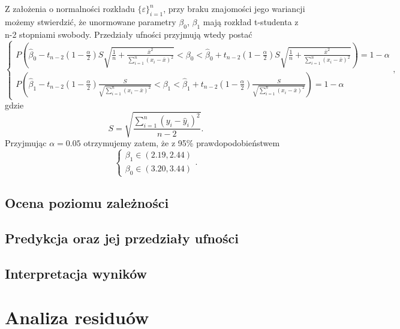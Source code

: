 \documentclass{article}
\theoremstyle{break}
\begin{document}
Z założenia o normalności rozkładu $\{\varepsilon\}_{i=1}^{n}$, przy braku znajomości jego wariancji możemy stwierdzić, że unormowane parametry $\beta_0$, $\beta_1$ mają rozkład t-studenta z n-2 stopniami swobody. Przedziały ufności przyjmują wtedy postać
\begin{equation}
\left\{ \begin{array}{ll}
	P\left(\hat{\beta}_{0}-t_{n-2}(1-\frac{\alpha}{2})S\sqrt{\frac{1}{n}+\frac{\bar{x}^{2}}{\sum_{i=1}^{n}(x_i-\bar{x})^2}} < \beta_{0} < \hat{\beta}_{0}+t_{n-2}(1-\frac{\alpha}{2})S\sqrt{\frac{1}{n}+\frac{\bar{x}^{2}}{\sum_{i=1}^{n}(x_i-\bar{x})^2}}\right) = 1-\alpha\\
	P\left(\hat{\beta}_{1}-t_{n-2}(1-\frac{\alpha}{2})\frac{S}{\sqrt{\sum_{i=1}^{n}(x_i-\bar{x})^2}} < \beta_{1} < \hat{\beta}_{1}+t_{n-2}(1-\frac{\alpha}{2})\frac{S}{\sqrt{\sum_{i=1}^{n}(x_i-\bar{x})^2}}\right) = 1-\alpha
\end{array} \right.,
\end{equation} gdzie
\begin{equation}
	S = \sqrt{\frac{\sum_{i=1}^{n}(y_i - \hat{y}_i)^2}{n-2}}.
\end{equation}
Przyjmując $\alpha = 0.05$ otrzymujemy zatem, że z 95\% prawdopodobieństwem
\begin{equation}
	\left\{ \begin{array}{ll}
		\beta_{1} \in (2.19, 2.44)\\
		\beta_{0} \in (3.20, 3.44)
	\end{array} \right..
\end{equation}

\subsection{Ocena poziomu zależności}

\subsection{Predykcja oraz jej przedziały ufności}

\subsection{Interpretacja wyników}

\section{Analiza residuów}
\end{document}

